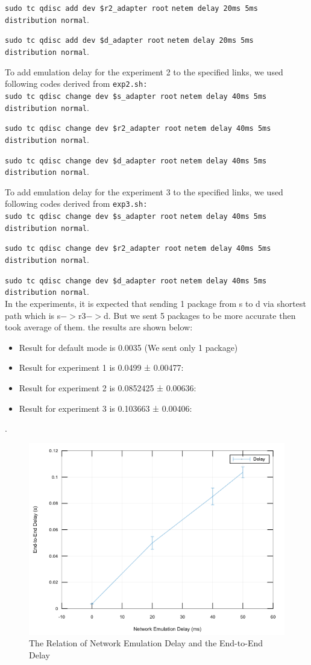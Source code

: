 \documentclass[conference]{IEEEtran}
\begin{document}
\verb|sudo tc qdisc add dev $r2_adapter root| \verb|netem delay 20ms 5ms distribution normal|.

\verb|sudo tc qdisc add dev $d_adapter root| \verb|netem delay 20ms 5ms distribution normal|.

To add emulation delay for the experiment 2 to the specified links, we used following codes derived from \verb|exp2.sh:|\\
\verb|sudo tc qdisc change dev $s_adapter root| \verb|netem delay 40ms 5ms distribution normal|.

\verb|sudo tc qdisc change dev $r2_adapter root| \verb|netem delay 40ms 5ms distribution normal|.

\verb|sudo tc qdisc change dev $d_adapter root| \verb|netem delay 40ms 5ms distribution normal|.

To add emulation delay for the experiment 3 to the specified links, we used following codes derived from \verb|exp3.sh:|\\
\verb|sudo tc qdisc change dev $s_adapter root| \verb|netem delay 40ms 5ms distribution normal|.

\verb|sudo tc qdisc change dev $r2_adapter root| \verb|netem delay 40ms 5ms distribution normal|.

\verb|sudo tc qdisc change dev $d_adapter root| \verb|netem delay 40ms 5ms distribution normal|.\\

In the experiments, it is expected that sending 1 package from s to d via shortest path which is s$->$r3$->$d. But we sent 5 packages to be more accurate then took average of them. the results are shown below:
\begin{itemize}
    \item Result for default mode is 0.0035 (We sent only 1 package) 
    \item Result for experiment 1 is 0.0499 ± 0.00477: 
    \item Result for experiment 2 is 0.0852425 ± 0.00636:
    \item Result for experiment 3 is 0.103663 ± 0.00406:
\end{itemize}. \\

\begin{figure}[h]
    \centering
    \includegraphics[width=8 cm, height=4 cm]{octave-online-line-10.png}
    \caption{The Relation of Network Emulation Delay and the End-to-End Delay }
    \label{fig}
\end{figure}
\end{document}
